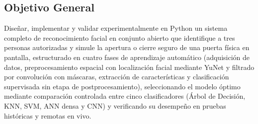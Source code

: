 \documentclass{article}
\begin{document}
\subsection{Objetivo General}
Diseñar, implementar y validar experimentalmente en Python un sistema completo de reconocimiento facial en conjunto abierto que identifique a tres personas autorizadas y simule la apertura o cierre seguro de una puerta física en pantalla, estructurado en cuatro fases de aprendizaje automático (adquisición de datos, preprocesamiento espacial con localización facial mediante YuNet y filtrado por convolución con máscaras, extracción de características y clasificación supervisada sin etapa de postprocesamiento), seleccionando el modelo óptimo mediante comparación controlada entre cinco clasificadores (Árbol de Decisión, KNN, SVM, ANN densa y CNN) y verificando su desempeño en pruebas históricas y remotas en vivo.
\end{document}
